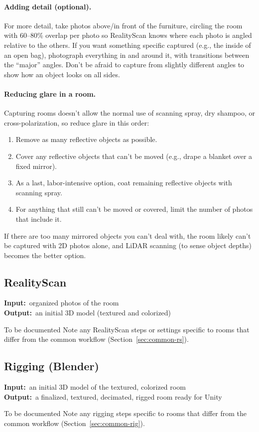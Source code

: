 \documentclass[11pt]{article}
\newcommand{\inout}[2]{%
    \begin{stageio}%
    \textbf{Input:}~#1\\[2pt]%
    \textbf{Output:}~#2%
    \end{stageio}%
}
\begin{document}
\paragraph{Adding detail (optional).} For more detail, take photos above/in front of the furniture, circling the room with 60--80\% overlap per photo so RealityScan knows where each photo is angled relative to the others. If you want something specific captured (e.g., the inside of an open bag), photograph everything in and around it, with transitions between the ``major'' angles. Don't be afraid to capture from slightly different angles to show how an object looks on all sides.

\paragraph{Reducing glare in a room.} Capturing rooms doesn't allow the normal use of scanning spray, dry shampoo, or cross-polarization, so reduce glare in this order:
\begin{enumerate}[leftmargin=1.6em]
  \item Remove as many reflective objects as possible.
  \item Cover any reflective objects that can't be moved (e.g., drape a blanket over a fixed mirror).
  \item As a last, labor-intensive option, coat remaining reflective objects with scanning spray.
  \item For anything that still can't be moved or covered, limit the number of photos that include it.
\end{enumerate}
If there are too many mirrored objects you can't deal with, the room likely can't be captured with 2D photos alone, and LiDAR scanning (to sense object depths) becomes the better option.

\subsection{RealityScan}
\inout{organized photos of the room}{an initial 3D model (textured and colorized)}
\begin{todobox}{To be documented}
Note any RealityScan steps or settings specific to rooms that differ from the common workflow (Section~\ref{sec:common-rs}).
\end{todobox}

\subsection{Rigging (Blender)}
\inout{an initial 3D model of the textured, colorized room}{a finalized, textured, decimated, rigged room ready for Unity}
\begin{todobox}{To be documented}
Note any rigging steps specific to rooms that differ from the common workflow (Section~\ref{sec:common-rig}).
\end{todobox}
\end{document}

